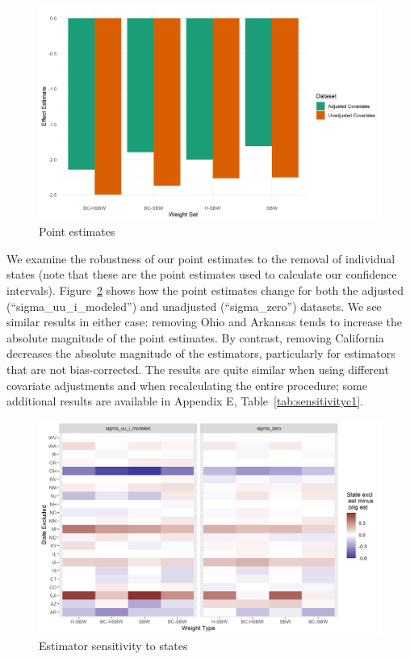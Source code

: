 \documentclass[12pt]{article}
\begin{document}
\begin{figure}[B]
\begin{center}
    \includegraphics[scale=0.6]{01_Plots/point-estimates-c1.png}
    \caption{Point estimates}
    \label{fig:estimators}
\end{center}
\end{figure}

We examine the robustness of our point estimates to the removal of individual states (note that these are the point estimates used to calculate our confidence intervals). Figure~\ref{fig:loostateplot} shows how the point estimates change for both the adjusted (``sigma\_uu\_i\_modeled'') and unadjusted (``sigma\_zero'') datasets. We see similar results in either case: removing Ohio and Arkansas tends to increase the absolute magnitude of the point estimates. By contrast, removing California decreases the absolute magnitude of the estimators, particularly for estimators that are not bias-corrected. The results are quite similar when using different covariate adjustments and when recalculating the entire procedure; some additional results are available in Appendix E, Table~\ref{tab:sensitivityc1}. 

\begin{figure}[]
\begin{center}
    \includegraphics[scale=0.6]{01_Plots/loostate-sensitivityc1-state-uu-i.png}
    \caption{Estimator sensitivity to states}
    \label{fig:loostateplot}
\end{center}
\end{figure}
\end{document}

